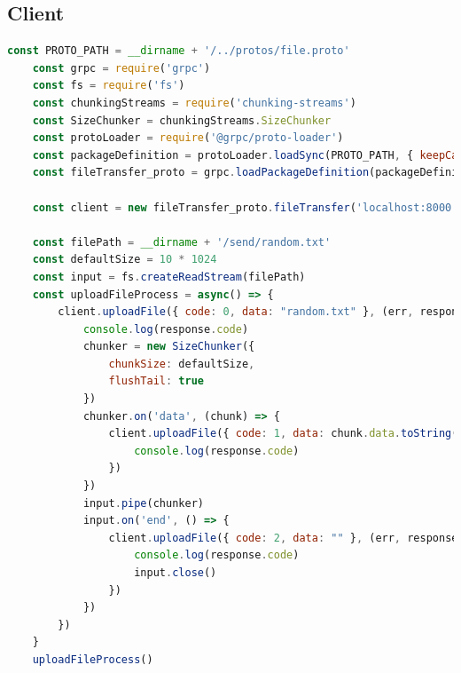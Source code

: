 \documentclass{article}
\begin{document}
\subsection{Client}
\begin{lstlisting}[language=javascript]
    const PROTO_PATH = __dirname + '/../protos/file.proto'
    const grpc = require('grpc')
    const fs = require('fs')
    const chunkingStreams = require('chunking-streams')
    const SizeChunker = chunkingStreams.SizeChunker
    const protoLoader = require('@grpc/proto-loader')
    const packageDefinition = protoLoader.loadSync(PROTO_PATH, { keepCase: true, longs: String, enums: String, defaults: true, oneofs: true })
    const fileTransfer_proto = grpc.loadPackageDefinition(packageDefinition).fileTransfer

    const client = new fileTransfer_proto.fileTransfer('localhost:8000', grpc.credentials.createInsecure())

    const filePath = __dirname + '/send/random.txt'
    const defaultSize = 10 * 1024
    const input = fs.createReadStream(filePath)
    const uploadFileProcess = async() => {
        client.uploadFile({ code: 0, data: "random.txt" }, (err, response) => {
            console.log(response.code)
            chunker = new SizeChunker({
                chunkSize: defaultSize,
                flushTail: true
            })
            chunker.on('data', (chunk) => {
                client.uploadFile({ code: 1, data: chunk.data.toString() }, (err, response) => {
                    console.log(response.code)
                })
            })
            input.pipe(chunker)
            input.on('end', () => {
                client.uploadFile({ code: 2, data: "" }, (err, response) => {
                    console.log(response.code)
                    input.close()
                })
            })
        })
    }
    uploadFileProcess()
\end{lstlisting}

\newpage
\end{document}

